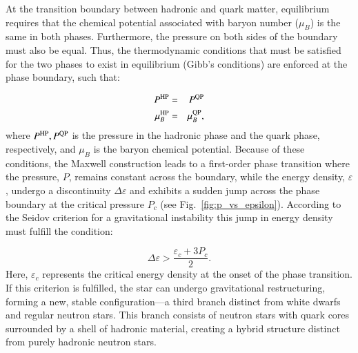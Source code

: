 \documentclass[main.tex]{subfiles}
\begin{document}
    At the transition boundary between hadronic and quark matter, equilibrium requires that the chemical potential associated with baryon number ($\mu_B$) is the same in both phases. Furthermore, the pressure on both sides of the boundary must also be equal. Thus, the thermodynamic conditions that must be satisfied for the two phases to exist in equilibrium (Gibb's conditions) are enforced at the phase boundary, such that:

    \begin{eqnarray}
        P^{\rm HP} &=& P^{\rm QP} \\
        \mu^{\rm HP}_B &=& \mu^{\rm QP}_B,
    \end{eqnarray}
    where $P^{\rm HP}, P^{\rm QP}$ is the pressure in the hadronic phase and the quark phase, respectively, and $\mu_B$ is the baryon chemical potential. Because of these conditions, the Maxwell construction leads to a first-order phase transition where the pressure, $P$, remains constant across the boundary, while the energy density, $\varepsilon$, undergo a discontinuity $\Delta \varepsilon$ and exhibits a sudden jump across the phase boundary at the critical pressure $P_c$ (see Fig.~\ref{fig:p_vs_epsilon}). According to the Seidov criterion \citep{Seidov:1971sas} for a gravitational instability this jump in energy density must fulfill the condition:
    
    \begin{equation}
        \Delta \varepsilon > \frac{\varepsilon_c + 3P_c}{2}.
        \label{eq:seidov_criterion}
    \end{equation}
    Here, $\varepsilon_c$ represents the critical energy density at the onset of the phase transition. If this criterion is fulfilled, the star can undergo gravitational restructuring, forming a new, stable configuration---a third branch distinct from white dwarfs and regular neutron stars. This branch consists of neutron stars with quark cores surrounded by a shell of hadronic material, creating a hybrid structure distinct from purely hadronic neutron stars.
    
    
    

\end{document}
